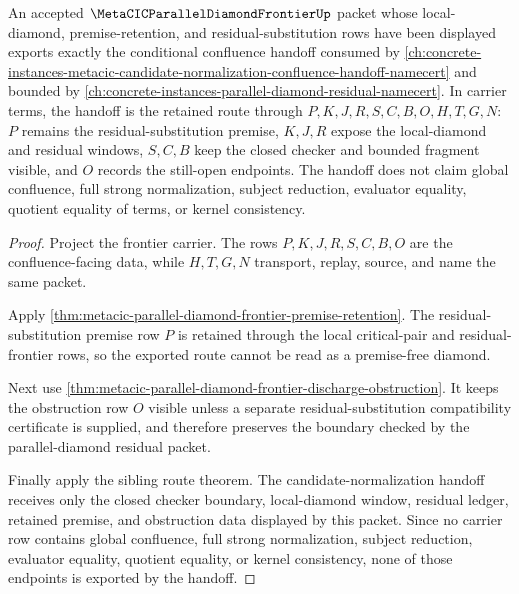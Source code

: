 \begin{theorem}
\label{thm:metacic-parallel-diamond-confluence-handoff}
An accepted $\MetaCICParallelDiamondFrontierUp$ packet whose local-diamond, premise-retention, and residual-substitution rows have been displayed exports exactly the conditional confluence handoff consumed by \autoref{ch:concrete-instances-metacic-candidate-normalization-confluence-handoff-namecert} and bounded by \autoref{ch:concrete-instances-parallel-diamond-residual-namecert}. In carrier terms, the handoff is the retained route through $P,K,J,R,S,C,B,O,H,T,G,N$: $P$ remains the residual-substitution premise, $K,J,R$ expose the local-diamond and residual windows, $S,C,B$ keep the closed checker and bounded fragment visible, and $O$ records the still-open endpoints. The handoff does not claim global confluence, full strong normalization, subject reduction, evaluator equality, quotient equality of terms, or kernel consistency.
\end{theorem}
\begin{proof}
Project the frontier carrier. The rows $P,K,J,R,S,C,B,O$ are the confluence-facing data, while $H,T,G,N$ transport, replay, source, and name the same packet.

Apply \autoref{thm:metacic-parallel-diamond-frontier-premise-retention}. The residual-substitution premise row $P$ is retained through the local critical-pair and residual-frontier rows, so the exported route cannot be read as a premise-free diamond.

Next use \autoref{thm:metacic-parallel-diamond-frontier-discharge-obstruction}. It keeps the obstruction row $O$ visible unless a separate residual-substitution compatibility certificate is supplied, and therefore preserves the boundary checked by the parallel-diamond residual packet.

Finally apply the sibling route theorem. The candidate-normalization handoff receives only the closed checker boundary, local-diamond window, residual ledger, retained premise, and obstruction data displayed by this packet. Since no carrier row contains global confluence, full strong normalization, subject reduction, evaluator equality, quotient equality, or kernel consistency, none of those endpoints is exported by the handoff.
\end{proof}

